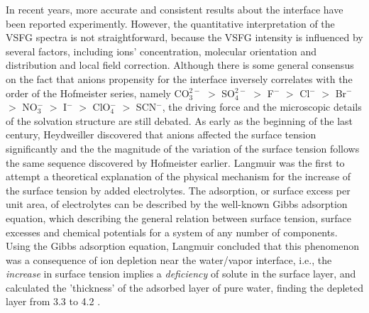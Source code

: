 In recent years, more accurate and consistent results about the interface have been reported experimently\cite{TianCS2009,Shen2013}. 
However, the quantitative interpretation of the VSFG spectra is not straightforward, because the VSFG intensity is influenced by several factors, including ions' concentration, 
molecular orientation and distribution and local field correction\cite{Morita2008}.
Although there is some general consensus on the fact that anions propensity for the interface inversely correlates with
the order of the Hofmeister series, namely 
CO$_3^{2-}$ $>$  SO$_4^{2-}$ $>$ F$^-$ $>$ Cl$^-$ $>$ Br$^-$ $>$ NO$_3^-$ $>$ I$^-$ $>$ ClO$_4^-$ $>$ SCN$^-$\cite{PJ06,ZYJ10,DT08,Parsons2011,HuaWei2013}, the driving force and the microscopic details of the solvation structure are still debated. 
As early as the beginning of the last century, Heydweiller discovered that anions affected the surface tension significantly
and the the magnitude of the variation of the surface tension follows the same sequence discovered by Hofmeister earlier\cite{dosSantos10}.
Langmuir\cite{Langmuir1917} was the first to attempt a theoretical explanation of the physical mechanism for the increase of the surface tension by added electrolytes.
The adsorption, or surface excess per unit area, of electrolytes can be described by the well-known Gibbs adsorption equation, which describing the general relation between
surface tension, surface excesses and chemical potentials for a system of any number of components.
Using the Gibbs adsorption equation, Langmuir concluded that this phenomenon was a consequence of ion depletion 
near the water/vapor interface, i.e., the \emph{increase} in surface tension 
implies a \emph{deficiency} of solute in the surface layer\cite{Jarvis1968}, and
calculated the 'thickness' of the adsorbed layer of pure water, finding 
the depleted layer from 3.3 to 4.2 \A. 
%


